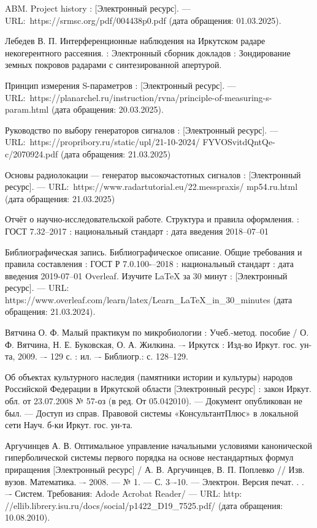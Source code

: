 \documentclass{report}
\begin{document}
\begin{thebibliography}{}

 ABM. Project history : [Электронный ресурс]. --– URL:~https://srmsc.org/pdf/004438p0.pdf (дата обращения: 01.03.2025).

  Лебедев В. П. Интерференционные наблюдения на Иркутском радаре некогерентного рассеяния. : Электронный сборник докладов : Зондирование земных покровов радарами с синтезированной апертурой.

 Принцип измерения S-параметров : [Электронный ресурс]. --– URL:~https://planarchel.ru/instruction/rvna/principle-of-measuring-s-param.html (дата обращения: 20.03.2025).

 Руководство по выбору генераторов сигналов : [Электронный ресурс]. --– URL:~https://propribory.ru/static/upl/21-10-2024/ FYVOSvitdQntQe-c/2070924.pdf (дата обращения: 21.03.2025)

 Основы радиолокации --- генератор высокочастотных сигналов : [Электронный ресурс]. --– URL:~https://www.radartutorial.eu/22.messpraxis/ mp54.ru.html (дата обращения: 21.03.2025)

    Отчёт о научно-исследовательской работе. Структура и правила оформления. : ГОСТ 7.32--2017 : национальный стандарт : дата введения 2018–07–01
    
    Библиографическая запись. Библиографическое описание. Общие требования и правила составления : ГОСТ Р 7.0.100-–2018 : национальный стандарт : дата введения 2019-07–01
    Overleaf. Изучите LaTeX за 30 минут : [Электронный ресурс]. --– URL: https://www.overleaf.com/learn/latex/Learn\_LaTeX\_in\_30\_minutes \break(дата обращения: 21.03.2024).

    Вятчина О. Ф. Малый практикум по микробиологии : Учеб.-метод. пособие / О. Ф. Вятчина, Н. Е. Буковская, О. А. Жилкина. –- Иркутск : Изд-во Иркут. гос. ун-та, 2009. –- 129 с. : ил. –- Библиогр.: с. 128–129.

    Об объектах культурного наследия (памятники истории и культуры) народов Российской Федерации в Иркутской области [Электронный ресурс]  : закон Иркут. обл. от 23.07.2008 № 57-оз (в ред. От 05.042010). --– Документ опубликован не был. --– Доступ из справ. Правовой системы «КонсультантПлюс» в локальной сети Науч. б-ки Иркут. гос. ун-та.
    
    Аргучинцев А. В. Оптимальное управление начальными условиями канонической гиперболической системы первого порядка на основе нестандартных формул приращения [Электронный ресурс] / А. В. Аргучинцев, В. П. Поплевко // Изв. вузов. Математика. –- 2008. --– № 1. --– С. 3–-10. --– Электрон. Версия печат. . . –- Систем. Требования: Adode Acrobat Reader/ --- URL: http: //ellib.librery.isu.ru/docs/social/p1422\_D19\_7525.pdf/ (дата обращения: 10.08.2010).

\end{thebibliography}
\end{document}
